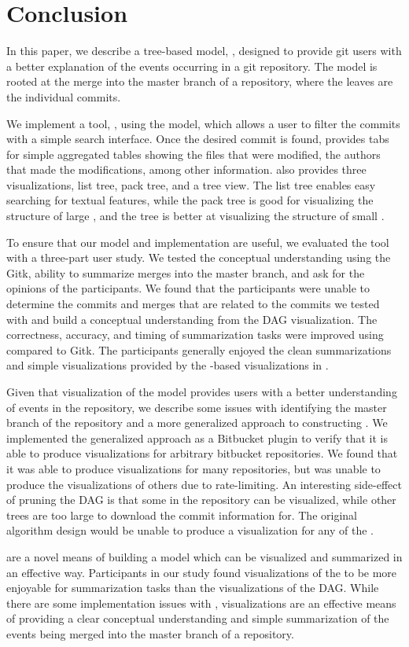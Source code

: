 \section{Conclusion}
\label{sec:conclusion}

In this paper, we describe a tree-based model, \mt, designed to provide git
users with a better explanation of the events occurring in a git
repository. The \mt model is rooted at the merge into the master branch
of a repository, where the leaves are the individual commits.

We implement a tool, \tool, using the \mt model, which allows a user to
filter the commits with a simple search interface. Once the desired
commit is found, \tool provides tabs for simple aggregated tables
showing the files that were modified, the authors that made the
modifications, among other information. \tool also provides three
visualizations, list tree, pack tree, and a \rt tree view. The list tree
enables easy searching for textual features, while the pack tree is good
for visualizing the structure of large , and the \rt tree is
better at visualizing the structure of small .

To ensure that our model and implementation are useful, we evaluated the
tool with a three-part user study. We tested the conceptual understanding
using the Gitk, ability to summarize merges into the master branch, and
ask for the opinions of the participants. We found that the participants
were unable to determine the commits and merges that are related to the
commits we tested with and build a conceptual understanding from the DAG
visualization. The correctness, accuracy, and timing of summarization
tasks were improved using \tool compared to Gitk. The participants
generally enjoyed the clean summarizations and simple visualizations
provided by the \mt-based visualizations in \tool.

Given that visualization of the model provides users with a better
understanding of events in the repository, we describe some issues with
identifying the master branch of the repository and a more generalized
approach to constructing . We implemented the generalized approach
as a Bitbucket plugin to verify that it is able to produce
visualizations for arbitrary bitbucket repositories. We found that it
was able to produce visualizations for many repositories, but was unable
to produce the visualizations of others due to rate-limiting. An
interesting side-effect of pruning the DAG is that some  in the
repository can be visualized, while other trees are too large to
download the commit information for. The original algorithm design would
be unable to produce a visualization for any of the .

 are a novel means of building a model which can be visualized and
summarized in an effective way. Participants in our study found
visualizations of the \mt to be more enjoyable for summarization tasks
than the visualizations of the DAG\@. While there are some
implementation issues with \tool, \mt visualizations are an effective
means of providing a clear conceptual understanding and simple
summarization of the events being merged into the master branch of a
repository.

